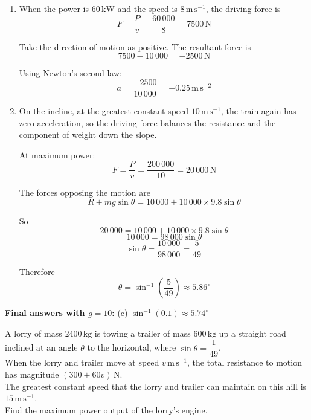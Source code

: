 \documentclass[leqno]{article}
\begin{document}
\begin{enumerate}[
  label=\textbf{\arabic*.},
  leftmargin=*,
  topsep=0pt,
  partopsep=0pt,
  parsep=0pt
]
\begin{djsSolution}
\begin{enumerate}[label=\textbf{(\alph*)}, start=1]
so
\[
R = 10\,000\,\mathrm{N}
\]

  \item When the power is $60\,\mathrm{kW}$ and the speed is $8\,\mathrm{m\,s^{-1}}$, the driving force is
\[
F=\frac{P}{v}=\frac{60\,000}{8}=7500\,\mathrm{N}
\]

Take the direction of motion as positive. The resultant force is
\[
7500-10\,000=-2500\,\mathrm{N}
\]

Using Newton's second law:
\[
a=\frac{-2500}{10\,000}=-0.25\,\mathrm{m\,s^{-2}}
\]

  \item On the incline, at the greatest constant speed $10\,\mathrm{m\,s^{-1}}$, the train again has zero acceleration, so the driving force balances the resistance and the component of weight down the slope.

At maximum power:
\[
F=\frac{P}{v}=\frac{200\,000}{10}=20\,000\,\mathrm{N}
\]

The forces opposing the motion are
\[
R + mg\sin\theta = 10\,000 + 10\,000\times 9.8\sin\theta
\]

So
\[
20\,000 = 10\,000 + 10\,000\times 9.8\sin\theta
\]
\[
10\,000 = 98\,000\sin\theta
\]
\[
\sin\theta = \frac{10\,000}{98\,000}=\frac{5}{49}
\]

Therefore
\[
\theta=\sin^{-1}\left(\frac{5}{49}\right)\approx 5.86^\circ
\]
\end{enumerate}
\par\medskip\noindent\textbf{Final answers with \(g = 10\):} (c) \(\sin^{-1}(0.1)\approx 5.74^\circ\)
\end{djsSolution}


\newpage

\questionitem

A lorry of mass $2400\,\mathrm{kg}$ is towing a trailer of mass $600\,\mathrm{kg}$ up a straight road inclined at an angle $\theta$ to the horizontal, where $\sin\theta=\dfrac{1}{49}$. \\

When the lorry and trailer move at speed $v\,\mathrm{m\,s^{-1}}$, the total resistance to motion has magnitude $(300+60v)\,\mathrm{N}$. \\

The greatest constant speed that the lorry and trailer can maintain on this hill is $15\,\mathrm{m\,s^{-1}}$. \\

Find the maximum power output of the lorry's engine. \\


\end{enumerate}
\end{document}
